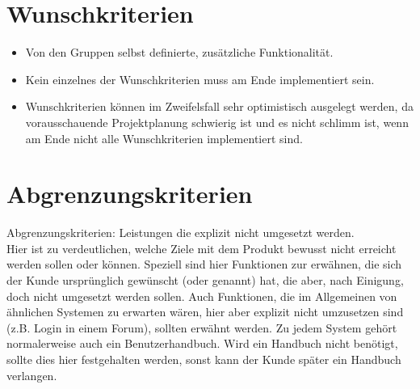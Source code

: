 \section{Wunschkriterien}\label{sec:wunschkriterien}

\begin{itemize}
\item Von den Gruppen selbst definierte, zusätzliche Funktionalität.
\item Kein einzelnes der Wunschkriterien muss am Ende implementiert sein.
\item Wunschkriterien können im Zweifelsfall sehr optimistisch ausgelegt
werden, da vorausschauende Projektplanung schwierig ist und es nicht
schlimm ist, wenn am Ende nicht alle Wunschkriterien implementiert sind.
\end{itemize}




\section{Abgrenzungskriterien}\label{sec:abgrenzungskriterien}
Abgrenzungskriterien: Leistungen die explizit nicht umgesetzt werden.\\
Hier ist zu verdeutlichen, welche Ziele mit dem Produkt bewusst nicht erreicht werden sollen oder können. 
Speziell sind hier Funktionen zur erwähnen, die sich der Kunde ursprünglich gewünscht (oder genannt) hat, die aber, nach Einigung, 
doch nicht umgesetzt werden sollen. Auch Funktionen, die im Allgemeinen von ähnlichen Systemen zu erwarten wären,
hier aber explizit nicht umzusetzen sind (z.B. Login in einem Forum), sollten erwähnt werden. 
Zu jedem System gehört normalerweise auch ein Benutzerhandbuch. Wird ein Handbuch nicht benötigt, 
sollte dies hier festgehalten werden, sonst kann der Kunde später ein Handbuch verlangen.

